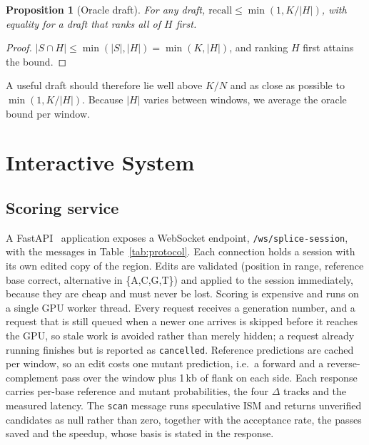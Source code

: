 \documentclass[conference]{IEEEtran}
\newtheorem{proposition}{Proposition}
\begin{document}
\begin{proposition}[Oracle draft]\label{prop:oracle}
For any draft, $\mathrm{recall}\le\min(1,K/|H|)$, with equality for a draft that ranks all of $H$ first.
\end{proposition}
\begin{proof}
$|S\cap H|\le\min(|S|,|H|)=\min(K,|H|)$, and ranking $H$ first attains the bound.
\end{proof}

A useful draft should therefore lie well above $K/N$ and as close as possible to $\min(1,K/|H|)$. Because $|H|$ varies between windows, we average the oracle bound per window.

\section{Interactive System}\label{sec:system}
\subsection{Scoring service}
A FastAPI~\cite{fastapi} application exposes a WebSocket endpoint, \texttt{/ws/splice-session}, with the messages in Table~\ref{tab:protocol}. Each connection holds a session with its own edited copy of the region. Edits are validated (position in range, reference base correct, alternative in \{A,C,G,T\}) and applied to the session immediately, because they are cheap and must never be lost. Scoring is expensive and runs on a single GPU worker thread. Every request receives a generation number, and a request that is still queued when a newer one arrives is skipped before it reaches the GPU, so stale work is avoided rather than merely hidden; a request already running finishes but is reported as \texttt{cancelled}. Reference predictions are cached per window, so an edit costs one mutant prediction, i.e.\ a forward and a reverse-complement pass over the window plus 1\,kb of flank on each side. Each response carries per-base reference and mutant probabilities, the four $\Delta$ tracks and the measured latency. The \texttt{scan} message runs speculative ISM and returns unverified candidates as null rather than zero, together with the acceptance rate, the passes saved and the speedup, whose basis is stated in the response.
\end{document}
